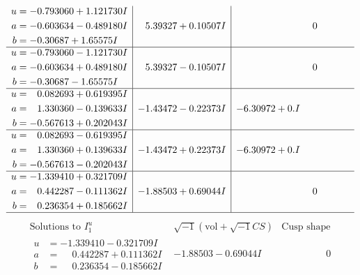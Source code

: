 \documentclass[1p]{elsarticle_modified}
\theoremstyle{definition}
\newcommand{\I}{\sqrt{-1}}
\begin{document}
$$\begin{array}{c|c|c}
\begin{aligned}
u &= -0.793060 + 1.121730 I \\
a &= -0.603634 - 0.489180 I \\
b &= -0.30687 + 1.65575 I\end{aligned}
 & \phantom{-}5.39327 + 0.10507 I & \phantom{-0.000000 } 0 \\ \hline\begin{aligned}
u &= -0.793060 - 1.121730 I \\
a &= -0.603634 + 0.489180 I \\
b &= -0.30687 - 1.65575 I\end{aligned}
 & \phantom{-}5.39327 - 0.10507 I & \phantom{-0.000000 } 0 \\ \hline\begin{aligned}
u &= \phantom{-}0.082693 + 0.619395 I \\
a &= \phantom{-}1.330360 - 0.139633 I \\
b &= -0.567613 + 0.202043 I\end{aligned}
 & -1.43472 - 0.22373 I & -6.30972 + 0. I\phantom{ +0.000000I} \\ \hline\begin{aligned}
u &= \phantom{-}0.082693 - 0.619395 I \\
a &= \phantom{-}1.330360 + 0.139633 I \\
b &= -0.567613 - 0.202043 I\end{aligned}
 & -1.43472 + 0.22373 I & -6.30972 + 0. I\phantom{ +0.000000I} \\ \hline\begin{aligned}
u &= -1.339410 + 0.321709 I \\
a &= \phantom{-}0.442287 - 0.111362 I \\
b &= \phantom{-}0.236354 + 0.185662 I\end{aligned}
 & -1.88503 + 0.69044 I & \phantom{-0.000000 } 0\\
 \hline 
 \end{array}$$\newpage$$\begin{array}{c|c|c}  
\text{Solutions to }I^u_{1}& \I (\text{vol} + \sqrt{-1}CS) & \text{Cusp shape}\\
 \hline 
\begin{aligned}
u &= -1.339410 - 0.321709 I \\
a &= \phantom{-}0.442287 + 0.111362 I \\
b &= \phantom{-}0.236354 - 0.185662 I\end{aligned}
 & -1.88503 - 0.69044 I & \phantom{-0.000000 } 0 \\ \hline\begin{aligned}

\end{aligned}
\end{array}$$
\end{document}
